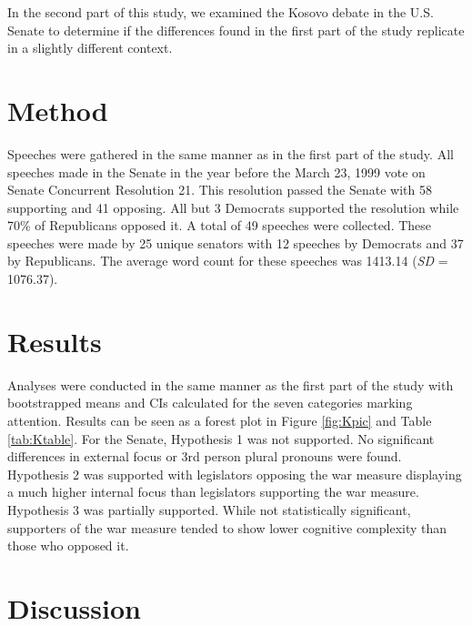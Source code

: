 \documentclass[english,,man,floatsintext]{apa6}
\begin{document}
In the second part of this study, we examined the Kosovo debate in the U.S. Senate to determine if the differences found in the first part of the study replicate in a slightly different context.

\hypertarget{method-2}{%
\section{Method}\label{method-2}}

Speeches were gathered in the same manner as in the first part of the study. All speeches made in the Senate in the year before the March 23, 1999 vote on Senate Concurrent Resolution 21. This resolution passed the Senate with 58 supporting and 41 opposing. All but 3 Democrats supported the resolution while 70\% of Republicans opposed it. A total of 49 speeches were collected. These speeches were made by 25 unique senators with 12 speeches by Democrats and 37 by Republicans. The average word count for these speeches was 1413.14 (\emph{SD} = 1076.37).

\hypertarget{results-1}{%
\section{Results}\label{results-1}}

Analyses were conducted in the same manner as the first part of the study with bootstrapped means and CIs calculated for the seven categories marking attention. Results can be seen as a forest plot in Figure \ref{fig:Kpic} and Table \ref{tab:Ktable}. For the Senate, Hypothesis 1 was not supported. No significant differences in external focus or 3rd person plural pronouns were found. Hypothesis 2 was supported with legislators opposing the war measure displaying a much higher internal focus than legislators supporting the war measure. Hypothesis 3 was partially supported. While not statistically significant, supporters of the war measure tended to show lower cognitive complexity than those who opposed it.

\hypertarget{discussion}{%
\section{Discussion}\label{discussion}}
\end{document}
